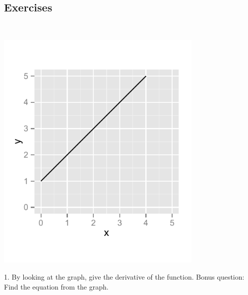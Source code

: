 \documentclass[a4paper]{report}
\begin{document}
\subsection{Exercises}
$\;$
\begin{Exercise}[title= Answer the following questions by looking at the graphs,label=ex0,difficulty=1]
\newcommand{\rat}{0.65}
\newcommand{\rati}{0.35}


\begin{minipage}{\rat\textwidth}
\includegraphics[width=0.75\textwidth]{1a.pdf}
\end{minipage}
\begin{minipage}{\rati\textwidth}
1. By looking at the graph, give the derivative of the function. Bonus question: Find the equation from the graph.
\end{minipage}


\end{Exercise}
\end{document}
